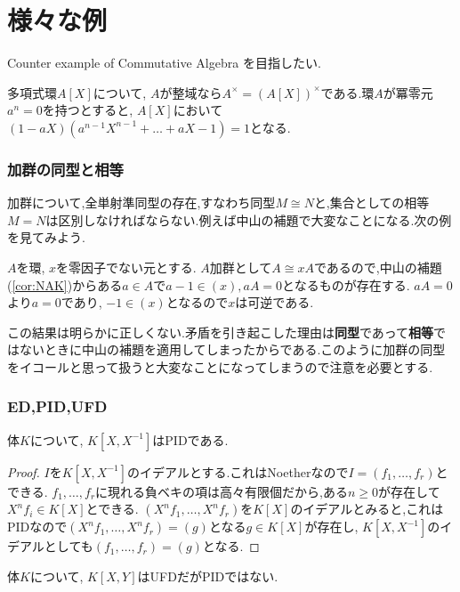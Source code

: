 \part[Appendix \thepart, Various Example]{様々な例}

Counter example of Commutative Algebra を目指したい.

多項式環$A[X]$について, $A$が整域なら$A^\times=(A[X])^\times$である.環$A$が冪零元$a^n=0$を持つとすると, $A[X]$において$(1-aX)(a^{n-1}X^{n-1}+\dots+aX-1)=1$となる.

\section{加群の同型と相等}

加群について,全単射準同型の存在,すなわち同型$M\cong N$と,集合としての相等$M=N$は区別しなければならない.例えば中山の補題で大変なことになる.次の例を見てみよう.

\begin{ex}
	$A$を環, $x$を零因子でない元とする. $A$加群として$A\cong xA$であるので,中山の補題(\ref{cor:NAK})からある$a\in A$で$a-1\in(x),aA=0$となるものが存在する. $aA=0$より$a=0$であり, $-1\in (x)$となるので$x$は可逆である.
\end{ex}

この結果は明らかに正しくない.矛盾を引き起こした理由は\textbf{同型}であって\textbf{相等}ではないときに中山の補題を適用してしまったからである.このように加群の同型をイコールと思って扱うと大変なことになってしまうので注意を必要とする.
\section{ED,PID,UFD}
\begin{surex}
	体$K$について, $K[X,X^{-1}]$はPIDである.
\end{surex}

\begin{proof}
	$I$を$K[X,X^{-1}]$のイデアルとする.これはNoetherなので$I=(f_1,\dots,f_r)$とできる. $f_1,\dots,f_r$に現れる負ベキの項は高々有限個だから,ある$n\geq0$が存在して$X^nf_i\in K[X]$とできる. $(X^nf_1,\dots,X^nf_r)$を$K[X]$のイデアルとみると,これはPIDなので$(X^nf_1,\dots,X^nf_r)=(g)$となる$g\in K[X]$が存在し, $K[X,X^{-1}]$のイデアルとしても$(f_1,\dots,f_r)=(g)$となる.
\end{proof}
\begin{surex}[UFDだがPIDでない環]
	体$K$について, $K[X,Y]$はUFDだがPIDではない.
\end{surex}

